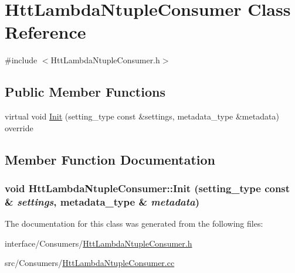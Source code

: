 \hypertarget{classHttLambdaNtupleConsumer}{
\section{HttLambdaNtupleConsumer Class Reference}
\label{classHttLambdaNtupleConsumer}
}


{\ttfamily \#include $<$HttLambdaNtupleConsumer.h$>$}\subsection*{Public Member Functions}
\begin{DoxyCompactItemize}
\item 
virtual void \hyperlink{classHttLambdaNtupleConsumer_a278fa321685d4715dba33b4db159a25b}{Init} (setting\_\-type const \&settings, metadata\_\-type \&metadata) override
\end{DoxyCompactItemize}


\subsection{Member Function Documentation}
\hypertarget{classHttLambdaNtupleConsumer_a278fa321685d4715dba33b4db159a25b}{
\subsubsection[{Init}]{\setlength{\rightskip}{0pt plus 5cm}void HttLambdaNtupleConsumer::Init (setting\_\-type const \& {\em settings}, \/  metadata\_\-type \& {\em metadata})}}
\label{classHttLambdaNtupleConsumer_a278fa321685d4715dba33b4db159a25b}


The documentation for this class was generated from the following files:\begin{DoxyCompactItemize}
\item 
interface/Consumers/\hyperlink{HttLambdaNtupleConsumer_8h}{HttLambdaNtupleConsumer.h}\item 
src/Consumers/\hyperlink{HttLambdaNtupleConsumer_8cc}{HttLambdaNtupleConsumer.cc}\end{DoxyCompactItemize}
